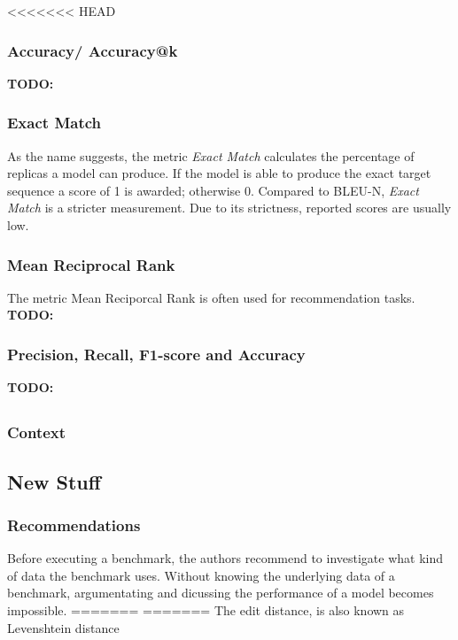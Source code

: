 \documentclass[11pt]{article}
\newcommand{\todo}[1]{{\textbf{TODO:}\ \textit{#1}}} %
\begin{document}
<<<<<<< HEAD
\subsubsection{Accuracy/ Accuracy@k}
\todo{}

\subsubsection{Exact Match}

As the name suggests, the metric \emph{Exact Match} calculates the percentage of replicas a model can produce.
If the model is able to produce the exact target sequence a score of 1 is awarded; otherwise 0.
Compared to BLEU-N, \emph{Exact Match} is a stricter measurement.
Due to its strictness, reported scores are usually low.

\subsubsection{Mean Reciprocal Rank}

The metric Mean Reciporcal Rank is often used for recommendation tasks.
\todo{}

\subsubsection{Precision, Recall, F1-score and Accuracy}
\todo{}

\subsection{}
\subsubsection{Context}
\subsection{New Stuff}

\subsubsection{Recommendations}

Before executing a benchmark, the authors recommend to investigate what kind of data the benchmark uses.
Without knowing the underlying data of a benchmark, argumentating and dicussing the performance of a model becomes impossible.
=======
=======
The edit distance, is also known as Levenshtein distance
\end{document}
